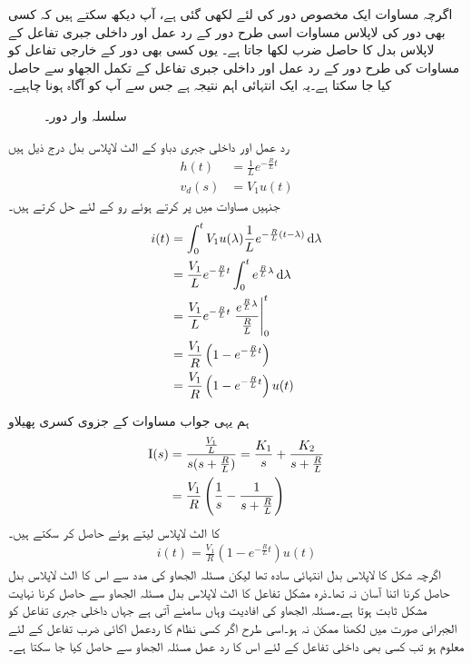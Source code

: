 اگرچہ مساوات  ایک مخصوص دور کی لئے لکھی گئی ہے، آپ دیکھ سکتے ہیں کہ کسی بھی دور کی لاپلاس مساوات اسی طرح دور کے رد عمل اور داخلی جبری تفاعل کے لاپلاس بدل کا حاصل ضرب لکھا جاتا ہے۔ یوں کسی بھی دور کے خارجی تفاعل کو مساوات  کی طرح دور کے رد عمل اور داخلی جبری تفاعل کے تکمل الجھاو  سے حاصل کیا جا سکتا ہے۔یہ ایک انتہائی اہم نتیجہ ہے جس سے آپ کو آگاہ ہونا چاہیے۔
\begin{figure}
\centering
{}
\caption{سلسلہ وار  دور۔}
\label{شکل_لاپلاس_دور_کا_حل}
\end{figure}

رد عمل  اور داخلی جبری دباو کے الٹ لاپلاس بدل درج ذیل ہیں
\begin{align*}
h(t)&=\frac{1}{L}e^{-\frac{R}{L}t}\\
v_d(s)&=V_1 u(t)
\end{align*}
جنہیں مساوات  میں پر کرتے ہوئے رو کے لئے حل کرتے ہیں۔
\begin{align*}
i(t)&=\int_0^t V_1 u(\lambda) \frac{1}{L}e^{-\frac{R}{L}(t-\lambda)} \dif \lambda\\
&=\frac{V_1}{L}e^{-\frac{R}{L}t}\int_0^t e^{\frac{R}{L}\lambda} \dif \lambda\\
&=\frac{V_1}{L}e^{-\frac{R}{L}t}\left. \frac{ e^{\frac{R}{L}\lambda}}{\frac{R}{L}} \right|_0^t\\
&=\frac{V_1}{R}\left(1-e^{-\frac{R}{L}t}\right)\\
&=\frac{V_1}{R}\left(1-e^{-\frac{R}{L}t}\right)u(t)
\end{align*}

ہم یہی جواب مساوات  کے جزوی کسری پھیلاو
\begin{align*}
{\ensuremath{{\textup{I}}}}(s)&=\frac{\frac{V_1}{L}}{s(s+\frac{R}{L})}=\frac{K_1}{s}+\frac{K_2}{s+\frac{R}{L}}\\
&=\frac{V_1}{R}\left(\frac{1}{s}-\frac{1}{s+\frac{R}{L}}\right)
\end{align*}
کا الٹ لاپلاس لیتے ہوئے حاصل کر سکتے ہیں۔
\begin{align*}
i(t)=\frac{V_1}{R}\left(1-e^{-\frac{R}{L}t}\right)u(t)
\end{align*}
اگرچہ شکل  کا لاپلاس بدل انتہائی سادہ تھا لیکن مسئلہ الجھاو کی مدد سے اس کا الٹ لاپلاس بدل حاصل کرنا اتنا آسان نہ تھا۔ذرہ مشکل تفاعل کا الٹ لاپلاس بدل مسئلہ الجھاو سے حاصل کرنا نہایت مشکل ثابت ہوتا ہے۔مسئلہ الجھاو کی افادیت وہاں سامنے آتی ہے جہاں داخلی جبری تفاعل کو الجبرائی صورت میں لکھنا ممکن نہ ہو۔اسی طرح اگر کسی نظام کا ردعمل اکائی ضرب تفاعل کے لئے معلوم ہو تب کسی بھی داخلی تفاعل کے لئے اس کا رد عمل مسئلہ الجھاو سے حاصل کیا جا سکتا ہے۔ 

